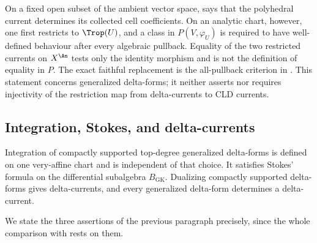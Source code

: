 \begin{remark}
\label{rem:ch18-two-quotients-analytic}
On a fixed open subset of the ambient vector space,
 says that the polyhedral current determines
its collected cell coefficients.  On an analytic chart, however, one first
restricts to $\Trop(U)$, and a class in $P(V,\varphi_U)$ is required to have
well-defined behaviour after every algebraic pullback.  Equality of the two
restricted currents on $X^{\An}$ tests only the identity morphism and is not
the definition of equality in $P$.  The exact faithful replacement is the
all-pullback criterion in
.  This statement concerns generalized
delta-forms; it neither asserts nor requires injectivity of the restriction
map from delta-currents to CLD currents.
\end{remark}

\subsection{Integration, Stokes, and delta-currents}
\label{sec:ch18-delta-currents}

Integration of compactly supported top-degree generalized delta-forms is
defined on one very-affine chart and is independent of that choice.  It
satisfies Stokes' formula on the differential subalgebra $B_{\mathrm{GK}}$.
Dualizing compactly supported delta-forms gives delta-currents, and every
generalized delta-form determines a delta-current.

We state the three assertions of the previous paragraph precisely, since the
whole comparison with  rests on them.

